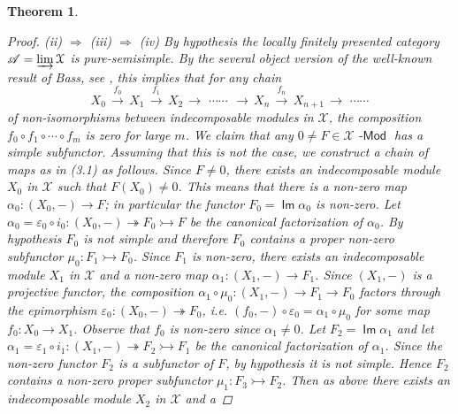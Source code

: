 \documentclass[oneside, a4paper,reqno]{amsart}
\numberwithin{equation}{section}
\newtheorem{thm}{Theorem}[section]
\theoremstyle{definition}
\begin{document}
\begin{thm}
\begin{proof}
(ii) $\Rightarrow$ (iii) $\Rightarrow$ (iv)  By hypothesis the
locally finitely presented category ${\mathscr A} = \operatorname*{\varinjlim}{\mathcal X}$ is
pure-semisimple. By the several object version of the well-known
result of Bass, see \cite{WCB}, this implies that for any chain
\begin{equation}
X_{0} \,\stackrel{f_{0}}{\longrightarrow} \, X_{1} \,\stackrel{f_{1}}{\longrightarrow} \,
X_{2} \, {\longrightarrow} \,\, \cdots \cdots \,\ {\longrightarrow} \, X_{n}
\,\stackrel{f_{n}}{\longrightarrow} \, X_{n+1} \,{\longrightarrow} \, \, \cdots \cdots
\end{equation}
of non-isomorphisms between indecomposable modules in ${\mathcal X}$, the
composition $f_{0} \circ f_{1} \circ \cdots \circ f_{m}$ is zero for
large $m$. We claim that any $0 \neq F \in {\mathcal X}\operatorname*{\!-\mathsf{Mod}}$ has a simple
subfunctor. Assuming  that this is not the case, we construct a
chain of maps as in (3.1) as follows. Since $F \neq 0$, there exists
an indecomposable module $X_{0}$ in ${\mathcal X}$ such that $F(X_{0}) \neq
0$. This means that there is a non-zero map $\alpha_{0} \colon
(X_{0},-) {\longrightarrow} F$; in particular the functor $F_{0} =
\operatorname*{\mathsf{Im}}\alpha_{0}$ is non-zero. Let $\alpha_{0} = \varepsilon_{0}
\circ i_{0} : (X_{0},-) {\twoheadrightarrow} F_{0} {\rightarrowtail} F$ be the canonical
factorization of $\alpha_{0}$. By hypothesis $F_{0}$ is not simple
and therefore $F_{0}$ contains a proper non-zero subfunctor $\mu_{0}
\colon F_{1} {\rightarrowtail} F_{0}$. Since $F_{1}$ is non-zero,
there exists an indecomposable module $X_{1}$ in ${\mathcal X}$ and a non-zero
map $\alpha_{1} \colon (X_{1},-) {\longrightarrow} F_{1}$.
 Since $(X_{1},-)$ is a projective
functor, the composition $\alpha_{1} \circ \mu_{0} \colon (X_{1},-)
{\longrightarrow} F_{1} {\longrightarrow} F_{0}$ factors through the epimorphism
$\varepsilon_{0} \colon (X_{0},-) {\twoheadrightarrow} F_{0}$, i.e. $(f_{0},-) \circ
\varepsilon_{0} = \alpha_{1} \circ \mu_{0}$ for some map $f_{0}
\colon X_{0} {\longrightarrow} X_{1}$. Observe that $f_{0}$ is non-zero since
$\alpha_{1} \neq 0$. Let $F_{2} = \operatorname*{\mathsf{Im}}\alpha_{1}$ and let
$\alpha_{1} = \varepsilon_{1} \circ i_{1} : (X_{1},-) {\twoheadrightarrow} F_{2}
{\rightarrowtail} F_{1}$ be the canonical factorization of $\alpha_{1}$. Since
the non-zero functor $F_{2}$ is a subfunctor of $F$, by hypothesis
it is not simple. Hence $F_{2}$ contains a non-zero proper
subfunctor $\mu_{1} \colon F_{3} {\rightarrowtail} F_{2}$. Then as
above there exists an indecomposable module $X_{2}$ in ${\mathcal X}$ and a

\end{proof}
\end{thm}
\end{document}
